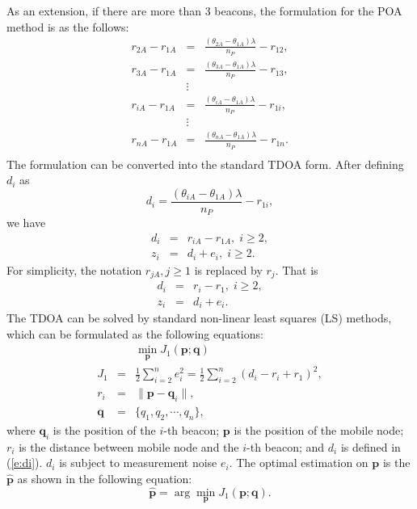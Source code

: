 As an extension, if there are more than 3 beacons, the formulation for the POA method is as the follows:
\begin{eqnarray*}
  r_{2A}-r_{1A} &=& \frac{(\theta_{2A}-\theta_{1A})\lambda}{n_P} - r_{12}, \\
  r_{3A}-r_{1A} &=& \frac{(\theta_{3A}-\theta_{1A})\lambda}{n_P} - r_{13}, \\
  &\vdots& \\
  r_{iA}-r_{1A} &=& \frac{(\theta_{iA}-\theta_{1A})\lambda}{n_P} - r_{1i}, \\
  &\vdots& \\
  r_{nA}-r_{1A} &=& \frac{(\theta_{nA}-\theta_{1A})\lambda}{n_P} - r_{1n}. \\
\end{eqnarray*}
The formulation can be converted into the standard TDOA form. After defining $d_i$ as
$$ d_i=\frac{(\theta_{iA}-\theta_{1A})\lambda}{n_P} - r_{1i},$$
we have
\begin{eqnarray*}
  d_i &=& r_{iA}-r_{1A},\; i\geq 2, \\
  z_i &=& d_i+e_i, \; i\geq 2.
\end{eqnarray*}
For simplicity, the notation $r_{jA}, j\geq 1$ is replaced by $r_j$. That is
\begin{eqnarray}
 d_i &=& r_{i}-r_{1},\; i\geq 2, \label{e:di} \\
 z_i &=& d_i+e_i. \nonumber
\end{eqnarray}
The TDOA can be solved by standard non-linear least squares (LS) methods, which can be formulated as the following equations:
\begin{eqnarray*}
   && \min_{\mathbf{p}} J_1(\mathbf{p}; \mathbf{q}) \\
  J_1 &=& \frac{1}{2}\sum_{i=2}^{n}e^2_i = \frac{1}{2} \sum_{i=2}^{n}(d_i-r_i+r_1)^2, \\
  r_i &=& \| \mathbf{p}-\mathbf{q}_i \|, \\
  \mathbf{q} &=& \{q_1, q_2, \cdots, q_{n} \},
\end{eqnarray*}
where $\mathbf{q}_i$ is the position of the $i$-th beacon; $\mathbf{p}$ is the position of the mobile node; $r_i$ is the distance between mobile node and the $i$-th beacon; and $d_i$ is defined in (\ref{e:di}). $d_i$ is subject to measurement noise $e_i$. The optimal estimation on $\mathbf{p}$ is the $\hat{\mathbf{p}}$ as shown in the following equation:
\begin{equation}\label{e:p}
 \hat{\mathbf{p}}=\arg\min_{\mathbf{p}} J_1 (\mathbf{p}; \mathbf{q}).
\end{equation}


